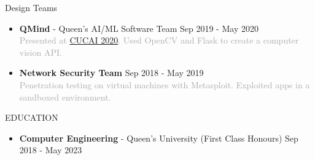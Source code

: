 \documentclass{resume} %
\begin{document}
\begin{rSection}{Design Teams}
    \begin{itemize}
        \item {\bf QMind} - Queen's AI/ML Software Team \hfill {Sep 2019 - May 2020}\\
        \textcolor{darkgray}{Presented at \href{https://medium.com/@cameronmackinn/cucai-2020-c821c15f3ab4}{CUCAI 2020}. Used OpenCV and Flask to create a computer vision API.}
        \item {\bf Network Security Team} \hfill {Sep 2018 - May 2019}\\
        \textcolor{darkgray}{Penetration testing on virtual machines with Metasploit. Exploited apps in a sandboxed environment.}
\end{itemize}
\end{rSection}

\begin{rSection}{EDUCATION}
    \begin{itemize}
        \item {\bf Computer Engineering} - Queen's University (First Class Honours) \hfill {Sep 2018 - May 2023}
    \end{itemize}
\end{rSection}
\end{document}
